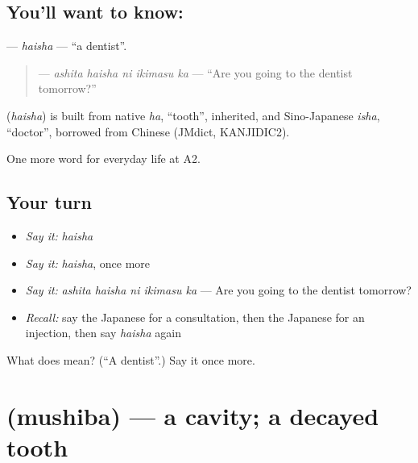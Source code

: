 \subsection*{You'll want to know: }
\textbf{} — \emph{haisha} — \textquotedblleft{}a dentist\textquotedblright{}.

\begin{quote}
\textbf{  } — \emph{ashita haisha ni ikimasu ka} — \textquotedblleft{}Are you going to the dentist tomorrow?\textquotedblright{}
\end{quote}

\begin{cousinweb}
\textbf{} (\emph{haisha}) is built from native \emph{ha}, \textquotedblleft{}tooth\textquotedblright{}, inherited, and Sino-Japanese \emph{isha}, \textquotedblleft{}doctor\textquotedblright{}, borrowed from Chinese (JMdict, KANJIDIC2).
\end{cousinweb}

\begin{grammarlens}[title={What you've built}]
One more word for everyday life at A2.
\end{grammarlens}

\subsection*{Your turn}
\begin{itemize}
\raggedright
  \item \emph{Say it:} \emph{haisha}
  \item \emph{Say it:} \emph{haisha}, once more
  \item \emph{Say it:} \emph{ashita haisha ni ikimasu ka} — Are you going to the dentist tomorrow?
  \item \emph{Recall:} say the Japanese for a consultation, then the Japanese for an injection, then say \emph{haisha} again
\end{itemize}

\begin{tcolorbox}[breakable,colback=teal!4,colframe=teal!35!black,title={Before you move on}]
What does  mean? (\textquotedblleft{}A dentist\textquotedblright{}.) Say it once more.
\end{tcolorbox}
\section[\texorpdfstring{\ja{むしば} (mushiba)}{むしば (mushiba)}]{ (mushiba) — a cavity; a decayed tooth}

